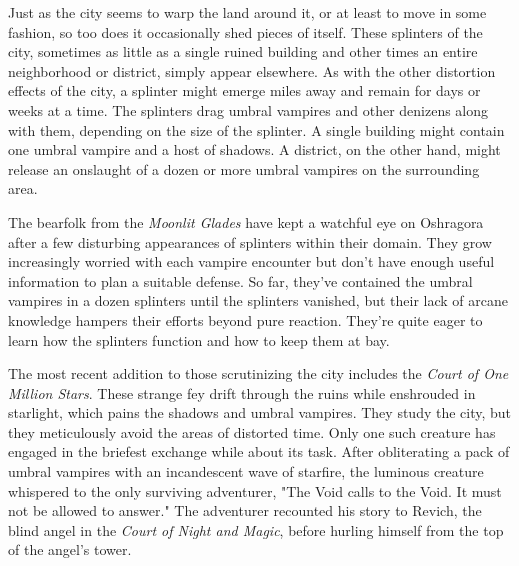 \documentclass[10pt,a4paper,twoside,bg=print,twocolumn,openany,nodeprecatedcode]{dndbook}
\begin{document}
Just as the city seems to warp the land around it, or at least to move in some fashion, so too does it occasionally shed pieces of itself. These splinters of the city, sometimes as little as a single ruined building and other times an entire neighborhood or district, simply appear elsewhere. As with the other distortion effects of the city, a splinter might emerge miles away and remain for days or weeks at a time. The splinters drag umbral vampires and other denizens along with them, depending on the size of the splinter. A single building might contain one umbral vampire and a host of shadows. A district, on the other hand, might release an onslaught of a dozen or more umbral vampires on the surrounding area.

The bearfolk from the \textit{Moonlit Glades} have kept a watchful eye on Oshragora after a few disturbing appearances of splinters within their domain. They grow increasingly worried with each vampire encounter but don't have enough useful information to plan a suitable defense. So far, they've contained the umbral vampires in a dozen splinters until the splinters vanished, but their lack of arcane knowledge hampers their efforts beyond pure reaction. They're quite eager to learn how the splinters function and how to keep them at bay.

The most recent addition to those scrutinizing the city includes the \textit{Court of One Million Stars}. These strange fey drift through the ruins while enshrouded in starlight, which pains the shadows and umbral vampires. They study the city, but they meticulously avoid the areas of distorted time. Only one such creature has engaged in the briefest exchange while about its task. After obliterating a pack of umbral vampires with an incandescent wave of starfire, the luminous creature whispered to the only surviving adventurer, "The Void calls to the Void. It must not be allowed to answer." The adventurer recounted his story to Revich, the blind angel in the \textit{Court of Night and Magic}, before hurling himself from the top of the angel's tower.
\end{document}
